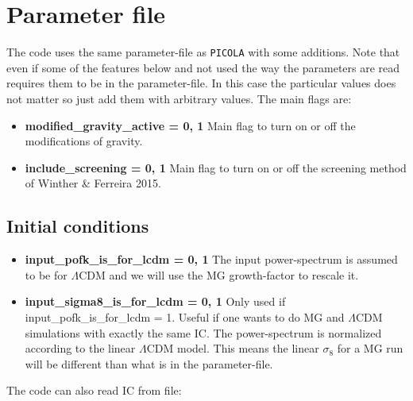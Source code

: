 \documentclass[usenatbib]{article}
\begin{document}
\section*{Parameter file}
The code uses the same parameter-file as \texttt{PICOLA} with some additions. Note that even if some of the features below and not used the way the parameters are read requires them to be in the parameter-file. In this case the particular values does not matter so just add them with arbitrary values. The main flags are:
\begin{itemize}

\item \textbf{modified\_gravity\_active = 0, 1} Main flag to turn on or off the modifications of gravity.

\item \textbf{include\_screening = 0, 1} Main flag to turn on or off the screening method of Winther \& Ferreira 2015.

\end{itemize}

\subsection*{Initial conditions}

\begin{itemize}

\item \textbf{input\_pofk\_is\_for\_lcdm = 0, 1}  The input power-spectrum is assumed to be for $\Lambda$CDM and we will use the MG growth-factor to rescale it.

\item \textbf{input\_sigma8\_is\_for\_lcdm = 0, 1} Only used if input\_pofk\_is\_for\_lcdm = 1. Useful if one wants to do MG and $\Lambda$CDM simulations with exactly the same IC. The power-spectrum is normalized according to the linear $\Lambda$CDM model. This means the linear $\sigma_8$ for a MG run will be different than what is in the parameter-file.

\end{itemize}

The code can also read IC from file:
\end{document}
